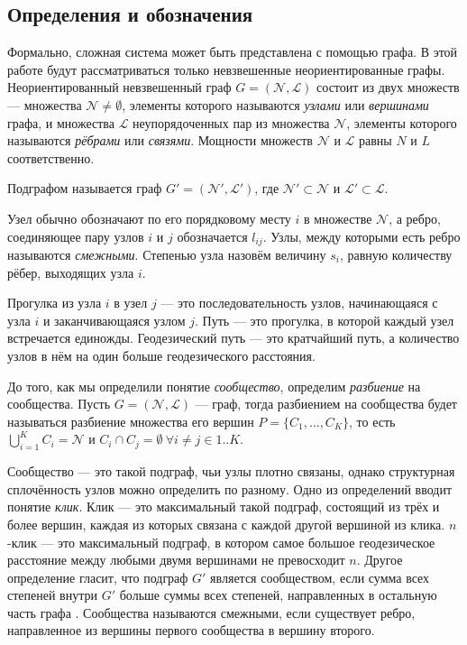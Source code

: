 
\subsection{Определения и обозначения}

Формально, сложная система может быть представлена с помощью графа. В этой работе будут рассматриваться только невзвешенные неориентированные графы. Неориентированный невзвешенный граф $G = (\mathscr{N}, \mathscr{L})$ состоит из двух множеств --- множества $\mathscr{N} \ne \emptyset$, элементы которого называются \emph{узлами} или \emph{вершинами} графа, и множества $\mathscr{L}$ неупорядоченных пар из множества $\mathscr{N}$, элементы которого называются \emph{рёбрами} или \emph{связями}. Мощности множеств $\mathscr{N}$ и $\mathscr{L}$ равны $N$ и $L$ соответственно.

Подграфом называется граф $G' = (\mathscr{N}', \mathscr{L}')$, где $\mathscr{N}' \subset \mathscr{N}$ и $\mathscr{L}' \subset \mathscr{L}$.

Узел обычно обозначают по его порядковому месту $i$ в множестве $\mathscr{N}$, а ребро, соединяющее пару узлов $i$ и $j$ обозначается $l_{ij}$. Узлы, между которыми есть ребро называются \emph{смежными}. Степенью узла назовём величину $s_i$, равную количеству рёбер, выходящих узла $i$.

Прогулка из узла $i$ в узел $j$ --- это последовательность узлов, начинающаяся с узла $i$ и заканчивающаяся узлом $j$. Путь --- это прогулка, в которой каждый узел встречается единожды. Геодезический путь --- это кратчайший путь, а количество узлов в нём на один больше геодезического расстояния.

До того, как мы определили понятие \emph{сообщество}, определим \emph{разбиение} на сообщества. Пусть $G = (\mathscr{N}, \mathscr{L})$ --- граф, тогда разбиением на сообщества будет называться разбиение множества его вершин $P = \{C_1, \dots, C_K\}$, то есть $\bigcup_{i = 1}^K C_i = \mathscr{N}$ и $C_i \cap C_j = \emptyset \ \forall i \neq j \in 1..K$.

Сообщество --- это такой подграф, чьи узлы плотно связаны, однако структурная сплочённость узлов можно определить по разному. Одно из определений вводит понятие \emph{клик}. Клик --- это максимальный такой подграф, состоящий из трёх и более вершин, каждая из которых связана с каждой другой вершиной из клика. $n$-клик --- это максимальный подграф, в котором самое большое геодезическое расстояние между любыми двумя вершинами не превосходит $n$. Другое определение гласит, что подграф $G'$ является сообществом, если сумма всех степеней внутри $G'$ больше суммы всех степеней, направленных в остальную часть графа \cite{Wasserman:1994}. Сообщества называются смежными, если существует ребро, направленное из вершины первого сообщества в вершину второго.

